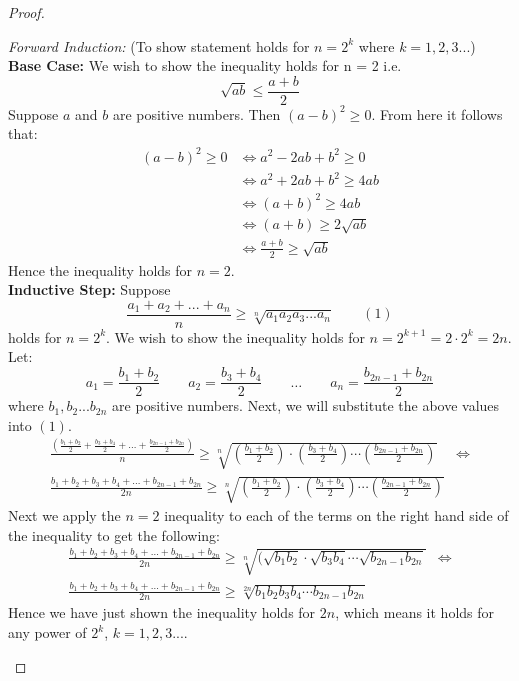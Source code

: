 \documentclass[12pt]{extreport}
\begin{document}
\begin{proof}
\begin{flushleft}
\textit{Forward Induction:} (To show statement holds for $n = 2^k$ where $k = 1, 2, 3...$) \\
\textbf{Base Case:} We wish to show the inequality holds for n = 2 i.e. $$\sqrt{ab} \leq \frac{a+b}{2}$$
Suppose $a$ and $b$ are positive numbers. Then $(a-b)^2 \geq 0$. From here it follows that:
\begin{align*}
(a-b)^2 \geq 0 &\iff a^2 - 2ab + b^2 \geq 0 \\
			   &\iff a^2 + 2ab + b^2 \geq 4ab \\
			   &\iff (a+b)^2 \geq 4ab \\
			   &\iff (a+b) \geq 2\sqrt{ab} \\
			   &\iff \frac{a+b}{2} \geq \sqrt{ab}
\end{align*}
Hence the inequality holds for $n=2$.\\
\textbf{Inductive Step:} Suppose $$\frac{a_1 + a_2 + ... + a_n}{n} \geq \sqrt[n]{a_1 a_2 a_3 ... a_n} \qquad (1)$$ holds for $n = 2^k$. We wish to show the inequality holds for $n = 2^{k+1} = 2 \cdot 2^k = 2n$. Let:
$$a_1 = \frac{b_1 + b_2}{2} \qquad a_2 = \frac{b_3 + b_4}{2} \qquad \ldots \qquad a_n = \frac{b_{2n-1} + b_{2n}}{2}$$
where $b_1, b_2 ... b_{2n}$ are positive numbers. Next, we will substitute the above values into $(1)$. 
\begin{align*}
\frac{ (\frac{b_1 + b_2}{2} + \frac{b_3 + b_4}{2} + \ldots + \frac{b_{2n-1} + b_{2n}}{2}) } {n} \geq \sqrt[n]{(\frac{b_1 + b_2}{2})\cdot(\frac{b_3 + b_4}{2})\cdots (\frac{b_{2n-1} + b_{2n}}{2})} &\iff \\
\frac{b_1 + b_2 + b_3 + b_4 + \ldots + b_{2n-1} + b_{2n}}{2n} \geq \sqrt[n]{(\frac{b_1 + b_2}{2}) \cdot (\frac{b_3 + b_4}{2}) \cdots (\frac{b_{2n-1} + b_{2n}}{2})}
\end{align*}
Next we apply the $n=2$ inequality to each of the terms on the right hand side of the inequality to get the following:
\begin{align*}
\frac{b_1 + b_2 + b_3 + b_4 + \ldots + b_{2n-1} + b_{2n}}{2n} \geq \sqrt[n]{(\sqrt{b_1b_2} \cdot \sqrt{b_3b_4} \cdots \sqrt{b_{2n-1}b_{2n}}} &\iff \\
\frac{b_1 + b_2 + b_3 + b_4 + \ldots + b_{2n-1} + b_{2n}}{2n} \geq \sqrt[2n]{b_1b_2b_3b_4 \cdots b_{2n-1}b_{2n}}
\end{align*}
Hence we have just shown the inequality holds for $2n$, which means it holds for any power of $2^k$, $k = 1,2,3...$. 
\end{flushleft}
\end{proof}
\end{document}
